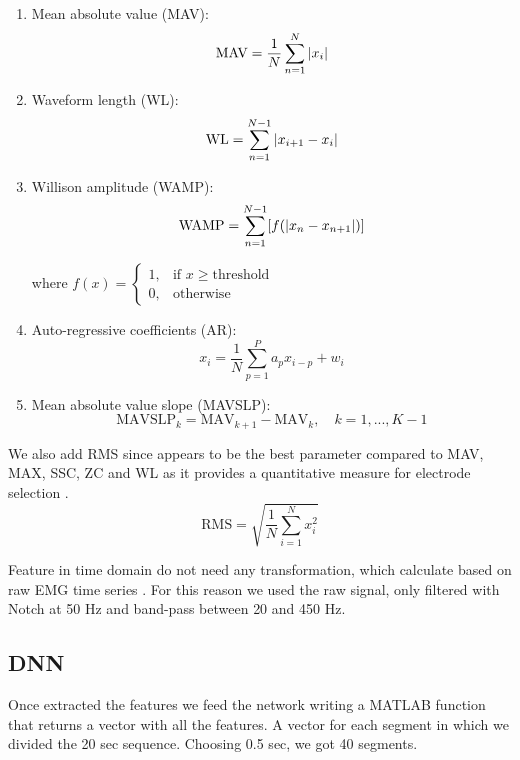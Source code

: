 \documentclass[journal]{IEEEtran}
\begin{document}
\begin{enumerate}
	\item Mean absolute value (MAV):
	\begin{equation}
	\text{MAV} = \frac{1}{N}\sum_{n=1}^{N}\abs{x_i}
	\label{eq1}
	\end{equation}
	
	\item Waveform length (WL):
	\begin{equation}
	\text{WL} = \sum_{n=1}^{N-1}\abs{x_{i+1}-x_i}
	\label{eq2}
	\end{equation}
	
	\item Willison amplitude (WAMP):
	\begin{equation}
	\text{WAMP} =\sum_{n=1}^{N-1}[f(\abs{x_n-x_{n+1}})]
	\label{eq3}
	\end{equation}
	
	where $f(x)= \begin{cases}
	1,	& \text{if } x\geq \text{threshold} \\
	0,  & \text{otherwise}
	\end{cases}$
	
	\item Auto-regressive coefficients (AR):
	\begin{equation}
	x_i=\frac{1}{N}\sum_{p=1}^{P}a_px_{i-p}+w_i
	\label{eq4}
	\end{equation}
	
	\item Mean absolute value slope (MAVSLP):
	\begin{equation}
	\text{MAVSLP}_k= \text{MAV}_{k+1}-\text{MAV}_k, \quad k = 1,...,K-1
	\label{eq5}
	\end{equation}
\end{enumerate}
We also add RMS since appears to be the best parameter compared to MAV, MAX, SSC, ZC and WL as it provides a quantitative measure for electrode selection \cite{b3}.
\begin{equation}
\text{RMS}= \sqrt{\frac{1}{N}\sum_{i=1}^{N}x_i^2}
\label{eq5}
\end{equation}

Feature in time domain do not need any transformation, which calculate based on raw EMG time series \cite{b3}.
For this reason we used the raw signal, only filtered with Notch at 50 Hz and band-pass between 20 and 450 Hz.

\subsection{DNN}
Once extracted the features we feed the network writing a MATLAB function that returns a vector with all the features. A vector for each segment in which we divided the 20 sec sequence. Choosing 0.5 sec, we got 40 segments. 
\end{document}
